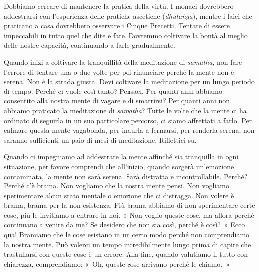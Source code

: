 Dobbiamo cercare di mantenere la pratica della virtù. I monaci
dovrebbero addestrarsi con l'esperienza delle pratiche ascetiche
(\emph{dhutaṅga}), mentre i laici che praticano a casa dovrebbero
osservare i Cinque Precetti. Tentate di essere impeccabili in tutto quel
che dite e fate. Dovremmo coltivare la bontà al meglio delle nostre
capacità, continuando a farlo gradualmente.

Quando inizi a coltivare la tranquillità della meditazione di
\emph{samatha}, non fare l'errore di tentare una o due volte per poi
rinunciare perché la mente non è serena. Non è la strada giusta. Devi
coltivare la meditazione per un lungo periodo di tempo. Perché ci vuole
così tanto? Pensaci. Per quanti anni abbiamo consentito alla nostra
mente di vagare e di smarrirsi? Per quanti anni non abbiamo praticato la
meditazione di \emph{samatha}? Tutte le volte che la mente ci ha
ordinato di seguirla in un suo particolare percorso, ci siamo affrettati
a farlo. Per calmare questa mente vagabonda, per indurla a fermarsi, per
renderla serena, non saranno sufficienti un paio di mesi di meditazione.
Riflettici su.

Quando ci impegniamo ad addestrare la mente affinché sia tranquilla in
ogni situazione, per favore comprendi che all'inizio, quando sorgerà
un'emozione contaminata, la mente non sarà serena. Sarà distratta e
incontrollabile. Perché? Perché c'è brama. Non vogliamo che la nostra
mente pensi. Non vogliamo sperimentare alcun stato mentale o emozione
che ci distragga. Non volere è brama, brama per la non-esistenza. Più
brama abbiamo di non sperimentare certe cose, più le invitiamo a entrare
in noi. «~Non voglio queste cose, ma allora perché continuano a venire
da me? Se desidero che non sia così, perché è così?~» Ecco qua! Bramiamo
che le cose esistano in un certo modo perché non comprendiamo la nostra
mente. Può volerci un tempo incredibilmente lungo prima di capire che
trastullarsi con queste cose è un errore. Alla fine, quando valutiamo il
tutto con chiarezza, comprendiamo: «~Oh, queste cose arrivano perché le
chiamo.~»


